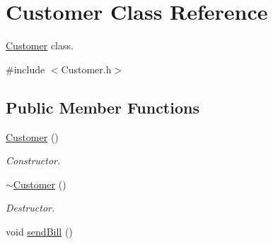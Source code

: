 \hypertarget{classCustomer}{}\section{Customer Class Reference}
\label{classCustomer}


\hyperlink{classCustomer}{Customer} class.  




{\ttfamily \#include $<$Customer.\+h$>$}

\subsection*{Public Member Functions}
\begin{DoxyCompactItemize}
\item 
\hyperlink{classCustomer_abcc8fae9701e5ba9d7d6fe44498b34e3}{Customer} ()\hypertarget{classCustomer_abcc8fae9701e5ba9d7d6fe44498b34e3}{}\label{classCustomer_abcc8fae9701e5ba9d7d6fe44498b34e3}

\begin{DoxyCompactList}\small\item\em Constructor. \end{DoxyCompactList}\item 
\hyperlink{classCustomer_ab93fb14683b0393b9c900109f77c2629}{$\sim$\+Customer} ()\hypertarget{classCustomer_ab93fb14683b0393b9c900109f77c2629}{}\label{classCustomer_ab93fb14683b0393b9c900109f77c2629}

\begin{DoxyCompactList}\small\item\em Destructor. \end{DoxyCompactList}\item 
void \hyperlink{classCustomer_a927d85cfe1f6c23af8dd2a3c73561f49}{send\+Bill} ()\hypertarget{classCustomer_a927d85cfe1f6c23af8dd2a3c73561f49}{}\label{classCustomer_a927d85cfe1f6c23af8dd2a3c73561f49}


\end{DoxyCompactItemize}
